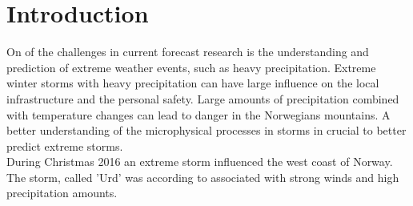\chapter{Introduction}
\label{ch:intro}
On of the challenges in current forecast research is the understanding and prediction of extreme weather events, such as heavy precipitation. 
Extreme winter storms with heavy precipitation can have large influence on the local infrastructure and the personal safety. Large amounts of precipitation combined with temperature changes can lead to danger in the Norwegians mountains. A better understanding of the microphysical processes in storms in crucial to better predict extreme storms. 
\\
During Christmas 2016 an extreme storm influenced the west coast of Norway.  The storm, called 'Urd' was according to \cite{olsen_ekstremvaerrapport._2017} associated with strong winds and high precipitation amounts. 
